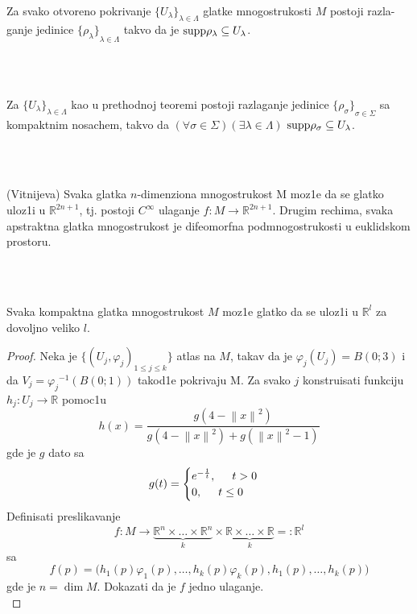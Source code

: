 \documentclass[a4paper,12pt]{article}
\newcommand{\latin}{\fontencoding{T1}\selectfont}
\newcommand{\RR}{\mathbb{R}}
\newcommand{\norm}[1]{\left\lVert#1\right\rVert}
\begin{document}
\begin{tma}
Za svako otvoreno pokrivanje ${\{U_{\lambda} \}}_{\lambda \in \Lambda}$ glatke mnogostrukosti $M$ postoji razla-ganje jedinice ${\{\rho_{\lambda} \}}_{\lambda \in \Lambda}$ takvo da je $\latin{\textrm{supp}} \rho_{\lambda} \subseteq U_{\lambda}$.
\end{tma}
\\ \\
\begin{tma}
Za ${\{U_{\lambda} \}}_{\lambda \in \Lambda}$ kao u prethodnoj teoremi postoji razlaganje jedinice ${\{\rho_{\sigma} \}}_{\sigma \in \Sigma}$ sa kompaktnim nosachem, takvo da $(\forall \sigma \in \Sigma)(\exists \lambda \in \Lambda)$ $\latin{\textrm{supp}} \rho_{\sigma} \subseteq U_{\lambda}$.
\end{tma}
\\ \\
\begin{tma}
(Vitnijeva) Svaka glatka $n$-dimenziona mnogostrukost M moz1e da se glatko uloz1i u $\RR^{2n+1}$, tj. postoji $C^{\infty}$ ulaganje  $f:M \to \RR^{2n+1}$. Drugim rechima, svaka apstraktna glatka mnogostrukost je difeomorfna podmnogostrukosti u euklidskom prostoru.
\end{tma}
\\ \\
\begin{tma}
Svaka kompaktna glatka mnogostrukost $M$ moz1e glatko da se uloz1i u $\RR^l$ za dovoljno veliko $l$.
\end{tma}
\begin{proof}
Neka je $\{{(U_j, \varphi_j)}_{1 \leq j \leq k} \}$ atlas na $M$, takav da je $\varphi_j(U_j) = B(0;3)$ i da $V_j = {\varphi_j}^{-1} (B(0;1))$ takod1e pokrivaju M. Za svako $j$ konstruisati funkciju $h_j : U_j \to \RR$ pomoc1u 
\[h(x) = \frac{g(4 - \norm{x}^2)}{g(4 - \norm{x}^2) + g(\norm{x}^2 - 1)}\]
gde je $g$ dato sa
\[
g(t)=
\begin{cases}
e^{-\frac{1}{t}}, \hspace{0.5cm} t>0\\
0, \hspace{0.5cm} t\leq0
\end{cases}
\]
Definisati preslikavanje \[f:M \to \underbrace{\RR^n \times \dots \times \RR^n}_{k}\times \underbrace{\RR \times \dots \times \RR}_{k} =: \RR^l\]
sa 
\[f(p) = \biggl(h_1(p)\varphi_1(p), \dots , h_k(p)\varphi_k(p), h_1(p), \dots , h_k(p)\biggr)\]
gde je $n = \dim M$. Dokazati da je $f$ jedno ulaganje.
\\
\end{proof}
\end{document}
